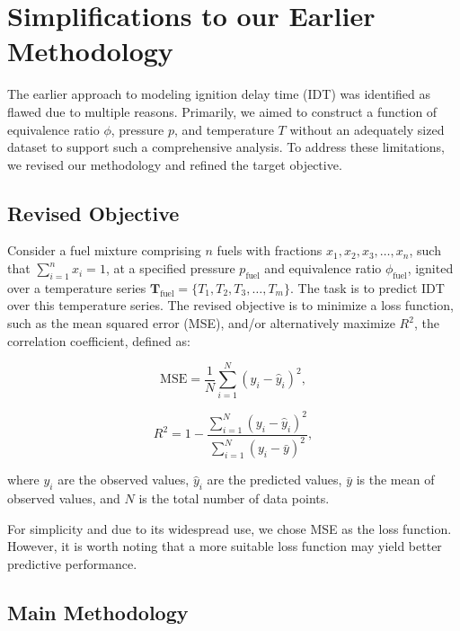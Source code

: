 \documentclass[12pt]{report}
\begin{document}
\section{Simplifications to our Earlier Methodology}

The earlier approach to modeling ignition delay time (IDT) was identified as flawed due to multiple reasons. Primarily, we aimed to construct a function of equivalence ratio $\phi$, pressure $p$, and temperature $T$ without an adequately sized dataset to support such a comprehensive analysis. To address these limitations, we revised our methodology and refined the target objective.

\subsection{Revised Objective}

Consider a fuel mixture comprising $n$ fuels with fractions $x_1, x_2, x_3, \ldots, x_n$, such that $\sum_{i=1}^n x_i = 1$, at a specified pressure $p_{\text{fuel}}$ and equivalence ratio $\phi_{\text{fuel}}$, ignited over a temperature series $\mathbf{T}_{\text{fuel}} = \{T_1, T_2, T_3, \ldots, T_m\}$. The task is to predict IDT over this temperature series. The revised objective is to minimize a loss function, such as the mean squared error (MSE), and/or alternatively maximize $R^2$, the correlation coefficient, defined as:

\[
\text{MSE} = \frac{1}{N} \sum_{i=1}^N (y_i - \hat{y}_i)^2,
\]

\[
R^2 = 1 - \frac{\sum_{i=1}^N (y_i - \hat{y}_i)^2}{\sum_{i=1}^N (y_i - \bar{y})^2},
\]

where $y_i$ are the observed values, $\hat{y}_i$ are the predicted values, $\bar{y}$ is the mean of observed values, and $N$ is the total number of data points.

For simplicity and due to its widespread use, we chose MSE as the loss function. However, it is worth noting that a more suitable loss function may yield better predictive performance.

\subsection{Main Methodology}
\end{document}
